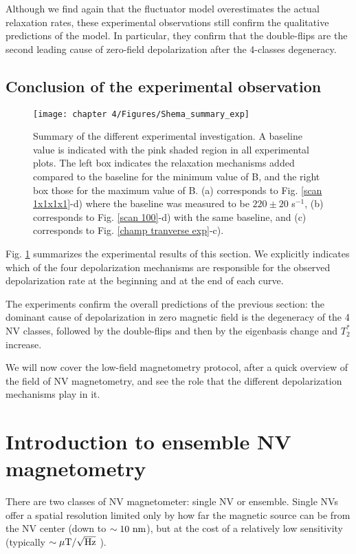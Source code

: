 \documentclass[a4paper, 11pt]{report}
\begin{document}
Although we find again that the fluctuator model overestimates the actual relaxation rates, these experimental observations still confirm the qualitative predictions of the model. In particular, they confirm that the double-flips are the second leading cause of zero-field depolarization after the 4-classes degeneracy.

\subsection{Conclusion of the experimental observation}

\begin{figure}[h!]
\centering
\texttt{[image: chapter 4/Figures/Shema\_summary\_exp]}
\caption{Summary of the different experimental investigation. A baseline value is indicated with the pink shaded region in all experimental plots. The left box indicates the relaxation mechanisms added compared to the baseline for the minimum value of B, and the right box those for the maximum value of B. (a) corresponds to Fig. \ref{scan 1x1x1x1}-d) where the baseline was measured to be $220\pm 20$ s$^{-1}$, (b) corresponds to Fig. \ref{scan 100}-d) with the same baseline, and (c) corresponds to Fig. \ref{champ tranverse exp}-c).}
\label{summary_exp}
\end{figure}

Fig. \ref{summary_exp} summarizes the experimental results of this section. We explicitly indicates which of the four depolarization mechanisms are responsible for the observed depolarization rate at the beginning and at the end of each curve.

The experiments confirm the overall predictions of the previous section: the dominant cause of depolarization in zero magnetic field is the degeneracy of the 4 NV classes, followed by the double-flips and then by the eigenbasis change and $T_2^*$ increase.

We will now cover the low-field magnetometry protocol, after a quick overview of the field of NV magnetometry, and see the role that the different depolarization mechanisms play in it.


\section{Introduction to ensemble NV magnetometry}
\label{sec 4.4}

There are two classes of NV magnetometer: single NV or ensemble. Single NVs offer a spatial resolution limited only by how far the magnetic source can be from the NV center (down to $\sim 10\ \rm nm$), but at the cost of a relatively low sensitivity (typically $\sim \mu \rm{T} / \sqrt{\rm Hz}$ \citep{pelliccione2016scanned}).
\end{document}
